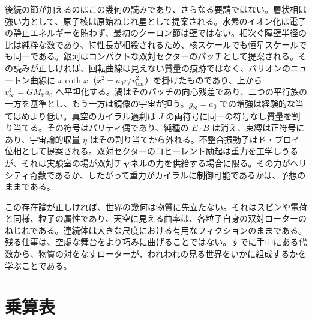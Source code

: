 \documentclass[a4paper]{article}
\begin{document}
後続の節が加えるのはこの幾何の読みであり、さらなる要請ではない。層状相は強い力として、原子核は原始ねじれ星として提案される。水素のイオン化は電子の静止エネルギーを賄わず、最初のクーロン節は壁ではない。相次ぐ障壁半径の比は純粋な数であり、特性長が相殺されるため、核スケールでも恒星スケールでも同一である。銀河はコンパクトな双対セクターのパッチとして提案される。その読みが正しければ、回転曲線は見えない質量の痕跡ではなく、バリオンのニュートン曲線に $x\coth x$（$x^2=a_0r/v_{\text{bar}}^2$）を掛けたものであり、上から $v_\infty^4=GM_{\text{b}}a_0$ へ平坦化する。渦はそのパッチの向心残差であり、二つの平行族の一方を基準とし、もう一方は鏡像の宇宙が担う。$g_{\text{N}}=a_0$ での増強は経験的な当てはめより低い。真空のカイラル過剰は $J$ の両符号に同一の符号なし質量を割り当てる。その符号はパリティ偶であり、純種の $E\cdot B$ は消え、束縛は正符号にあり、宇宙論的収量 $\eta$ はその割り当てから外れる。不整合振動子はド・ブロイ位相として提案される。双対セクターのコヒーレント励起は重力を工学しうるが、それは実験室の場が双対チャネルの力を供給する場合に限る。その力がヘリシティ奇数であるか、したがって重力がカイラルに制御可能であるかは、予想のままである。

この存在論が正しければ、世界の幾何は物質に先立たない。それはスピンや電荷と同様、粒子の属性であり、天空に見える曲率は、各粒子自身の双対ローターのねじれである。連続体は大きな尺度における有用なフィクションのままである。残る仕事は、空虚な舞台をより巧みに曲げることではない。すでに手中にある代数から、物質の対をなすローターが、われわれの見る世界をいかに組成するかを学ぶことである。

\clearpage
\appendix

\section{乗算表}
\label{app:mult-table}
\end{document}
